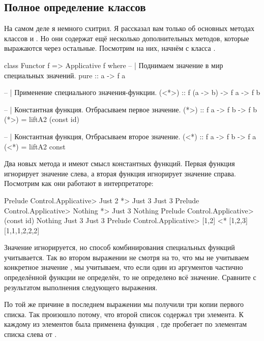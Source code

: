 \subsection{Полное определение классов}

На самом деле я немного схитрил. Я рассказал вам только об основных
методах классов  и . Но они содержат ещё
несколько дополнительных методов, которые выражаются через остальные.
Посмотрим на них, начнём с класса .


\begin{code}
class Functor f => Applicative f where
        -- | Поднимаем значение в мир специальных значений.
        pure :: a -> f a

        -- | Применение специального значения-функции.
        (<*>) :: f (a -> b) -> f a -> f b

        -- | Константная функция. Отбрасываем первое значение.
        (*>) :: f a -> f b -> f b
        (*>) = liftA2 (const id)
        
        -- | Константная функция, Отбрасываем второе значение.
        (<*) :: f a -> f b -> f a
        (<*) = liftA2 const
\end{code}

Два новых метода \In{(*>)} и \In{(<*)} имеют смысл константных функций.
Первая функция игнорирует значение слева, а вторая функция игнорирует
значение справа. Посмотрим как они работают в интерпретаторе:


\begin{code}
Prelude Control.Applicative> Just 2 *> Just 3
Just 3
Prelude Control.Applicative> Nothing *> Just 3
Nothing
Prelude Control.Applicative> (const id) Nothing  Just 3
Just 3
Prelude Control.Applicative> [1,2] <* [1,2,3]
[1,1,1,2,2,2]
\end{code}

Значение игнорируется, но способ комбинирования специальных функций
учитывается. Так во втором выражении не смотря на то, что мы не
учитываем конкретное значение , мы учитываем, что если один
из аргументов частично определённой функции не определён, то не
определено всё значение. Сравните с результатом выполнения следующего
выражения.

По той же причине в последнем выражении мы получили три копии первого
списка. Так произошло потому, что второй список содержал три элемента. К
каждому из элементов была применена функция , где 
пробегает по элементам списка слева от \In{(<*)}.

